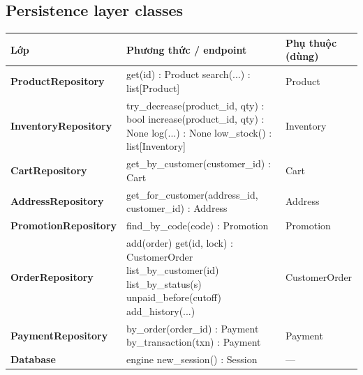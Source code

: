\documentclass[12pt,a4paper,oneside]{report}
\begin{document}
\subsection{Persistence layer classes}
\begin{longtable}{@{}>{\raggedright\arraybackslash\small\bfseries}p{3.4cm}>{\raggedright\arraybackslash\ttfamily\footnotesize}p{7.2cm}>{\raggedright\arraybackslash\footnotesize}p{4.6cm}@{}}\toprule Lớp & Phương thức / endpoint & Phụ thuộc (dùng)\\\midrule\endhead
ProductRepository & get(id) : Product \newline search(...) : list[Product] & Product\\\midrule
InventoryRepository & try\_decrease(product\_id, qty) : bool \newline increase(product\_id, qty) : None \newline log(...) : None \newline low\_stock() : list[Inventory] & Inventory\\\midrule
CartRepository & get\_by\_customer(customer\_id) : Cart & Cart\\\midrule
AddressRepository & get\_for\_customer(address\_id, customer\_id) : Address & Address\\\midrule
PromotionRepository & find\_by\_code(code) : Promotion & Promotion\\\midrule
OrderRepository & add(order) \newline get(id, lock) : CustomerOrder \newline list\_by\_customer(id) \newline list\_by\_status(s) \newline unpaid\_before(cutoff) \newline add\_history(...) & CustomerOrder\\\midrule
PaymentRepository & by\_order(order\_id) : Payment \newline by\_transaction(txn) : Payment & Payment\\\midrule
Database & engine \newline new\_session() : Session & ---\\\midrule
\bottomrule\end{longtable}
\end{document}
